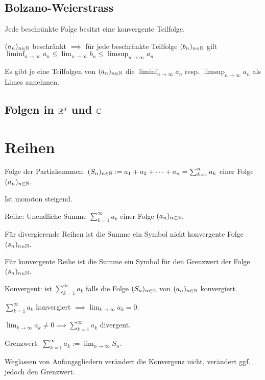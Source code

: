 \subsection{Bolzano-Weierstrass}
Jede beschränkte Folge besitzt eine konvergente Teilfolge.
\begin{compactitem}
    \item $(a_n)_{n \in \mathbb{N}}$ beschränkt $\implies$ für jede beschränkte Teilfolge $(b_n)_{n \in \mathbb{N}}$ gilt $\liminf_{n \to \infty} a_n \le \lim_{n \to \infty} b_n \le  \limsup_{n \to \infty} a_n$
    \item Es gibt je eine Teilfolgen von $(a_n)_{n \in \mathbb{N}}$ die $\liminf_{n \to \infty} a_n$ resp. $\limsup_{n \to \infty} a_n$ als Limes annehmen.
\end{compactitem}

\subsection{Folgen in $\mathbb{R}^{d}$ und $\mathbb{C}$}

\section{Reihen}
\begin{compactdesc}
    \item[Folge der Partialsummen:] $(S_n)_{n \in \mathbb{N}} := a_1 + a_2 + \dots + a_n = \sum_{k=1}^{n} a_k$ einer Folge $(a_n)_{n \in \mathbb{N}}$.
        \begin{compactitem}
            \item Ist monoton steigend.
        \end{compactitem}
    \item[Reihe:] Unendliche Summe $\sum_{k=1}^{\infty} a_k$ einer Folge $(a_n)_{n \in \mathbb{N}}$.
        \begin{compactitem}
            \item Für divergierende Reihen ist die Summe ein Symbol nicht konvergente Folge $(s_n)_{n \in \mathbb{N}}$.
            \item Für konvergente Reihe ist die Summe ein Symbol für den Grenzwert der Folge $(s_n)_{n \in \mathbb{N}}$.
        \end{compactitem}
    \item[Konvergent:] ist $\sum_{k=1}^{\infty} a_k$ falls die Folge $(S_n)_{n \in \mathbb{N}}$ von $(a_n)_{n \in \mathbb{N}}$ konvergiert.
        \begin{compactitem}
            \item $\sum_{k=1}^{\infty} a_k$ konvergiert $\implies \lim_{k \to \infty} a_k = 0 $.
            \item $\lim_{k \to \infty} a_k \neq  0 \implies \sum_{k=1}^{\infty} a_k$ divergent.
        \end{compactitem}
    \item[Grenzwert:] $\sum_{k=1}^{\infty} a_k := \lim_{n \to \infty} S_n$.
    \item Weglassen von Anfangsgliedern verändert die Konvergenz nicht, verändert ggf. jedoch den Grenzwert.
\end{compactdesc}

